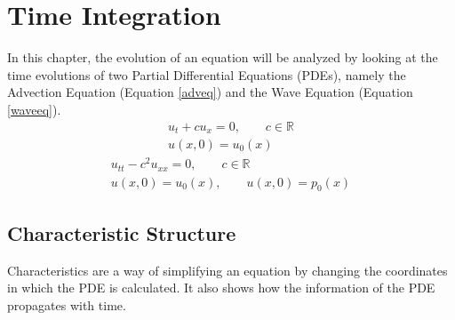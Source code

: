 \chapter{Time Integration}
In this chapter, the evolution of an equation will be analyzed by looking at the time evolutions of two Partial Differential Equations (PDEs), namely the Advection Equation (Equation \ref{adveq}) and the Wave Equation (Equation \ref{waveeq}).
\begin{equation} \label{adveq}
\begin{gathered}
  u_t + cu_x = 0, \qquad c \in \mathbb{R} \\ 
  u(x,0) = u_0(x)
\end{gathered}
\end{equation}
\begin{equation} \label{waveeq}
\begin{gathered}
  u_{tt} - c^2u_{xx} = 0, \qquad c \in \mathbb{R} \\ 
  u(x,0) = u_0(x), \qquad u(x,0) = p_0(x)
\end{gathered}
\end{equation}
\section{Characteristic Structure}
Characteristics are a way of simplifying an equation by changing the coordinates in which the PDE is calculated. It also shows how the information of the PDE propagates with time.
